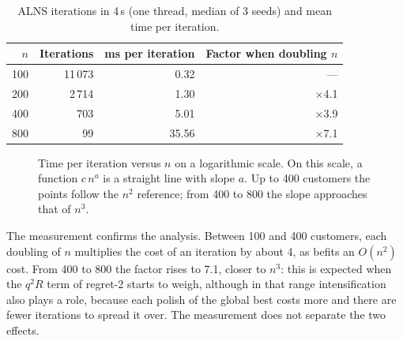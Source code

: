 \documentclass[11pt,a4paper]{article}
\begin{document}
\begin{table}[H]
\centering
\caption{ALNS iterations in 4\,s (one thread, median of 3 seeds) and mean time per iteration.}
\label{tab:medicion}
\small
\begin{tabular}{@{}rrrr@{}}
\toprule
$n$ & Iterations & ms per iteration & Factor when doubling $n$ \\
\midrule
100 & 11\,073 & 0.32 & --- \\
200 & 2\,714 & 1.30 & $\times$4.1 \\
400 & 703 & 5.01 & $\times$3.9 \\
800 & 99 & 35.56 & $\times$7.1 \\
\bottomrule
\end{tabular}
\end{table}

\begin{figure}[H]
\centering
{}
\caption{Time per iteration versus $n$ on a logarithmic scale. On this scale, a function $c\,n^a$ is a
straight line with slope $a$. Up to 400 customers the points follow the $n^2$ reference; from 400 to
800 the slope approaches that of $n^3$.}
\label{fig:complejidad}
\end{figure}

The measurement confirms the analysis. Between 100 and 400 customers, each doubling of $n$ multiplies
the cost of an iteration by about 4, as befits an $O(n^2)$ cost. From 400 to 800 the factor rises to
7.1, closer to $n^3$: this is expected when the $q^2R$ term of regret-2 starts to weigh, although in
that range intensification also plays a role, because each polish of the global best costs more and
there are fewer iterations to spread it over. The measurement does not separate the two effects.
\end{document}
